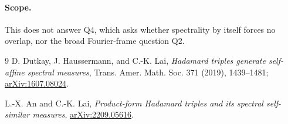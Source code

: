 \documentclass[10pt]{article}
\begin{document}
\paragraph{Scope.}
This does not answer Q4, which asks whether spectrality by itself forces
no overlap, nor the broad Fourier-frame question Q2.

\begin{thebibliography}{9}
D. Dutkay, J. Haussermann, and C.-K. Lai,
\emph{Hadamard triples generate self-affine spectral measures},
Trans. Amer. Math. Soc. 371 (2019), 1439--1481;
\href{https://arxiv.org/abs/1607.08024}{arXiv:1607.08024}.

L.-X. An and C.-K. Lai,
\emph{Product-form Hadamard triples and its spectral self-similar measures},
\href{https://arxiv.org/abs/2209.05616}{arXiv:2209.05616}.
\end{thebibliography}
\end{document}

